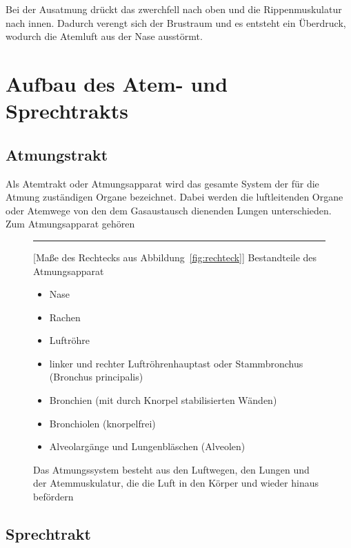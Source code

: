 \documentclass[ngerman, a4paper, twoside]{scrbook}%
\begin{document}
	Bei der Ausatmung drückt das zwerchfell nach oben und die Rippenmuskulatur nach innen. Dadurch verengt sich der Brustraum und es entsteht ein Überdruck, wodurch die Atemluft aus der Nase ausstörmt.

	\section{Aufbau des Atem- und Sprechtrakts}
	\subsection{Atmungstrakt}
	Als Atemtrakt oder Atmungsapparat wird das gesamte System der für die Atmung zuständigen Organe bezeichnet. Dabei werden die luftleitenden Organe oder Atemwege von den dem Gasaustausch dienenden Lungen unterschieden.\\

	Zum Atmungsapparat gehören
	\newpage
	\begin{figure}
		\begin{minipage}{.5\linewidth}
			\centering
			\rule{4cm}{5cm}%
			\caption{Das Atmungssystem besteht aus den Luftwegen, den Lungen und der Atemmuskulatur, die die Luft in den Körper und wieder hinaus befördern}\label{fig:Atemtrakt}
		\end{minipage}%
		\begin{minipage}{.5\linewidth}
			\centering
			[Maße des Rechtecks aus Abbildung~\ref{fig:rechteck}]%
			{Bestandteile des Atmungsapparat}\label{tab:rechteck}
				\begin{itemize}
					 \item Nase
					 \item Rachen
					 \item Luftröhre
					 \item linker und rechter Luftröhrenhauptast oder Stammbronchus (Bronchus principalis)
					 \item Bronchien (mit durch Knorpel stabilisierten Wänden)
					 \item Bronchiolen (knorpelfrei)
					 \item Alveolargänge und Lungenbläschen (Alveolen)
				\end{itemize}
		\end{minipage}
	\end{figure}

	\subsection{Sprechtrakt}
\end{document}
